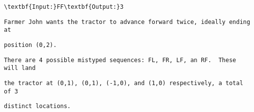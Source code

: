 \begin{verbatim}
\textbf{Input:}FF\textbf{Output:}3\end{verbatim}
\begin{verbatim}
Farmer John wants the tractor to advance forward twice, ideally ending at \end{verbatim}
\begin{verbatim}
position (0,2).\end{verbatim}
\begin{verbatim}
There are 4 possible mistyped sequences: FL, FR, LF, an RF.  These will land \end{verbatim}
\begin{verbatim}
the tractor at (0,1), (0,1), (-1,0), and (1,0) respectively, a total of 3 \end{verbatim}
\begin{verbatim}
distinct locations.\end{verbatim}